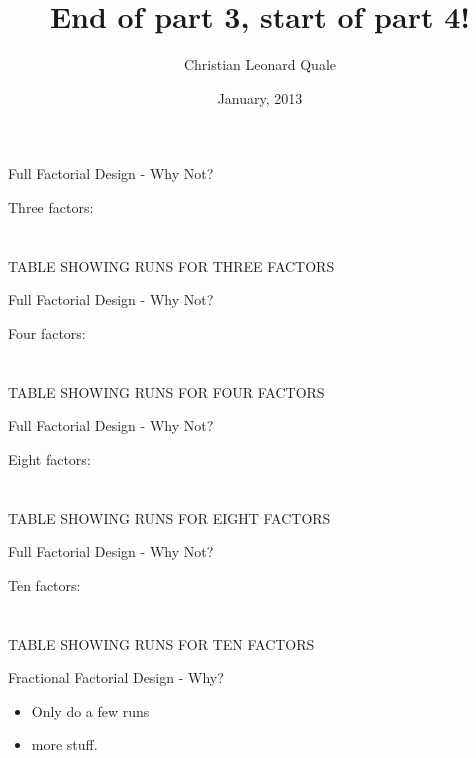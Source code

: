 \documentclass[14pt]{beamer}
\title[EPDM Presentation]{End of part 3, start of part 4!}
\author[C. L. Quale]{Christian Leonard Quale}
\institute{
  University of Edinburgh
}
\date[January 2013]{January, 2013}
\begin{document}
\begin{frame}[plain]
  \titlepage
\end{frame}

\begin{frame}{Full Factorial Design - Why Not?}

Three factors: \\
\ \\
\ \\
TABLE SHOWING RUNS FOR THREE FACTORS

\end{frame}

\begin{frame}{Full Factorial Design - Why Not?}

Four factors: \\
\ \\
\ \\
TABLE SHOWING RUNS FOR FOUR FACTORS

\end{frame}

\begin{frame}{Full Factorial Design - Why Not?}

Eight factors: \\
\ \\
\ \\
TABLE SHOWING RUNS FOR EIGHT FACTORS

\end{frame}

\begin{frame}{Full Factorial Design - Why Not?}

Ten factors: \\
\ \\
\ \\
TABLE SHOWING RUNS FOR TEN FACTORS

\end{frame}

\begin{frame}{Fractional Factorial Design - Why?}

\begin{itemize}
\item Only do a few runs
\pause
\item  more stuff.

\end{itemize}

\end{frame}
\end{document}
